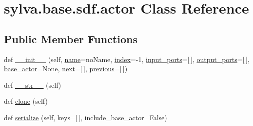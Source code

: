 \hypertarget{classsylva_1_1base_1_1sdf_1_1actor}{}\section{sylva.\+base.\+sdf.\+actor Class Reference}
\label{classsylva_1_1base_1_1sdf_1_1actor}
\subsection*{Public Member Functions}
\begin{DoxyCompactItemize}
\item 
def \hyperlink{classsylva_1_1base_1_1sdf_1_1actor_a54b20a91faff7f7d083257c95d6768d0}{\+\_\+\+\_\+init\+\_\+\+\_\+} (self, \hyperlink{classsylva_1_1base_1_1sdf_1_1actor_a2ef1df32bd9d891a43df5b59cdc2f33b}{name}=\textquotesingle{}no\+Name\textquotesingle{}, \hyperlink{classsylva_1_1base_1_1sdf_1_1actor_a876d41fa48c3a1a6d62fc3054b321f08}{index}=-\/1, \hyperlink{classsylva_1_1base_1_1sdf_1_1actor_aad8739c0c518eb7017949d07effee1b2}{input\+\_\+ports}=\mbox{[}$\,$\mbox{]}, \hyperlink{classsylva_1_1base_1_1sdf_1_1actor_aa145dfb1abe65febe991235fb715f44e}{output\+\_\+ports}=\mbox{[}$\,$\mbox{]}, \hyperlink{classsylva_1_1base_1_1sdf_1_1actor_ae9b1e79fcf5e63107ae89ba68ecc4743}{base\+\_\+actor}=None, \hyperlink{classsylva_1_1base_1_1sdf_1_1actor_aa182473926fcf5c58d284b5f23351629}{next}=\mbox{[}$\,$\mbox{]}, \hyperlink{classsylva_1_1base_1_1sdf_1_1actor_ac3043c8e8aa528bb6d00465b0a1964d3}{previous}=\mbox{[}$\,$\mbox{]})
\item 
def \hyperlink{classsylva_1_1base_1_1sdf_1_1actor_a248646977b9a90dee1b48077eacb9e6d}{\+\_\+\+\_\+str\+\_\+\+\_\+} (self)
\item 
def \hyperlink{classsylva_1_1base_1_1sdf_1_1actor_a366534a2c6988eb885d89b7259c5b411}{clone} (self)
\item 
def \hyperlink{classsylva_1_1base_1_1sdf_1_1actor_abad5148eadd915c067c20ee575f56e1e}{serialize} (self, keys=\mbox{[}$\,$\mbox{]}, include\+\_\+base\+\_\+actor=False)
\end{DoxyCompactItemize}
